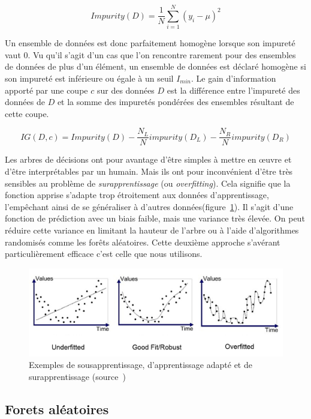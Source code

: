\begin{equation}
	Impurity(D) = \frac{1}{N} \sum_{i=1}^N(y_i - \mu)^2 
\end{equation}

Un ensemble de données est donc parfaitement homogène lorsque son impureté vaut 0.
Vu qu'il s'agit d'un cas que l'on rencontre rarement pour des ensembles de données de plus d'un élément, 
un ensemble de données est déclaré homogène si son impureté est inférieure ou égale à un seuil $I_{min}$.
Le gain d'information apporté par une coupe $c$ sur des données $D$ est la différence entre l'impureté des données de $D$ et la somme des impuretés pondérées des ensembles résultant de cette coupe.

\begin{equation}
 IG(D, c) = Impurity(D) - \frac{N_{L}}{N}impurity(D_L) -\frac{N_{R}}{N}impurity(D_R)
\end{equation}

Les arbres de décisions ont pour avantage d'être simples à mettre en œuvre et d'être interprétables par un humain.
Mais ils ont pour inconvénient d'être très sensibles au problème de \emph{surapprentissage} (ou \emph{overfitting}).
Cela signifie que la fonction apprise s'adapte trop étroitement aux données d'apprentissage, l'empêchant ainsi de se généraliser à d'autres données(figure~\ref{fig:overfitting}).
Il s'agit d'une fonction de prédiction avec un biais faible, mais une variance très élevée.
On peut réduire cette variance en limitant la hauteur de l'arbre ou à l'aide d'algorithmes randomisés comme les forêts aléatoires.
Cette deuxième approche s'avérant particulièrement efficace c'est celle que nous utilisons. 

\begin{figure}
	\centering
	\includegraphics[width=\linewidth]{graphics/figures/overfitting.png}
	\caption{\label{fig:overfitting}Exemples de sousapprentissage, d'apprentissage adapté et de surapprentissage (source~\cite{overfitting})}
\end{figure}


\subsection{Forets aléatoires}

